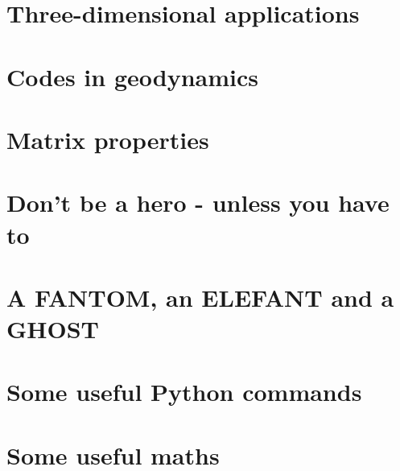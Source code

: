 \documentclass[a4paper]{article}
\begin{document}
\section{Three-dimensional applications}  %
\newpage %
\section{Codes in geodynamics \label{app:codes} } %
\newpage %
\section{Matrix properties}  %
\newpage %
\section{Don’t be a hero - unless you have to}  %
\newpage %
\section{A FANTOM, an ELEFANT and a GHOST}  %
\newpage %
\section{Some useful Python commands}  %
\newpage %
\section{Some useful maths}  \label{app_maths} %



\newpage %
\printindex %
\newpage %
\listoftodos[Notes] %
\end{document}
